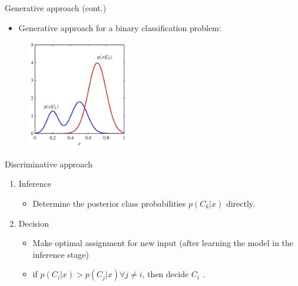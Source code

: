 \documentclass[serif, aspectratio=169]{beamer}
\begin{document}
\begin{frame}{Generative approach (cont.)}

    \begin{itemize}
        \item Generative approach for a binary classification problem:
    \end{itemize}
    \begin{figure}[h]
      \centering
      \includegraphics[width=0.4\textwidth]{pic/Generative.png}
      \end{figure}
    \vfill
\end{frame}
\begin{frame}{Discriminative approach}
    \begin{enumerate}
        \item Inference
        \begin{itemize}
            \item Determine the posterior class probabilities $p(C_k|x)$ directly.
        \end{itemize}
        \item Decision
        \begin{itemize}
            \item Make optimal assignment for new input (after learning the model in the inference stage)
            \item if $p(C_i|x) > p(C_j|x) \forall j \neq i$, then decide $C_i$ .
        \end{itemize}
    \end{enumerate}
\end{frame}
\end{document}
